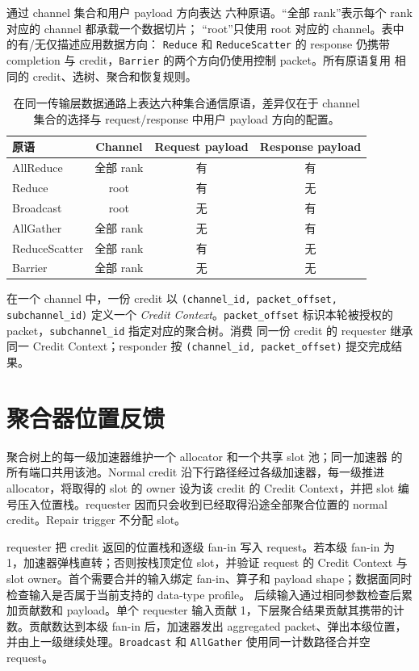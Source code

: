  通过 channel 集合和用户 payload 方向表达
六种原语。``全部 rank''表示每个 rank 对应的 channel 都承载一个数据切片；
``root''只使用 root 对应的 channel。表中的有/无仅描述应用数据方向：
\texttt{Reduce} 和 \texttt{ReduceScatter} 的 response 仍携带 completion
与 credit，\texttt{Barrier} 的两个方向仍使用控制 packet。所有原语复用
相同的 credit、选树、聚合和恢复规则。

\begin{table}[t]
\centering
\caption{\sysname 在同一传输层数据通路上表达六种集合通信原语，差异仅在于
channel 集合的选择与 request/response 中用户 payload 方向的配置。}
\label{tab:collective-mapping}
\begin{tabular}{lccc}
\toprule
原语 & Channel & Request payload & Response payload \\
\midrule
AllReduce & 全部 rank & 有 & 有 \\
Reduce & root & 有 & 无 \\
Broadcast & root & 无 & 有 \\
AllGather & 全部 rank & 无 & 有 \\
ReduceScatter & 全部 rank & 有 & 无 \\
Barrier & 全部 rank & 无 & 无 \\
\bottomrule
\end{tabular}
\end{table}

在一个 channel 中，一份 credit 以 \texttt{(channel\_id, packet\_offset,
subchannel\_id)} 定义一个 \emph{Credit Context}。\texttt{packet\_offset}
标识本轮被授权的 packet，\texttt{subchannel\_id} 指定对应的聚合树。消费
同一份 credit 的 requester 继承同一 Credit Context；responder 按
\texttt{(channel\_id, packet\_offset)} 提交完成结果。

\section{聚合器位置反馈}
\label{ssec:agg-feedback}

聚合树上的每一级加速器维护一个 allocator 和一个共享 slot 池；同一加速器
的所有端口共用该池。Normal credit 沿下行路径经过各级加速器，每一级推进
allocator，将取得的 slot 的 owner 设为该 credit 的 Credit Context，并把
slot 编号压入位置栈。requester 因而只会收到已经取得沿途全部聚合位置的
normal credit。Repair trigger 不分配 slot。

requester 把 credit 返回的位置栈和逐级 fan-in 写入 request。若本级
fan-in 为 1，加速器弹栈直转；否则按栈顶定位 slot，并验证 request 的
Credit Context 与 slot owner。首个需要合并的输入绑定 fan-in、算子和
payload shape；数据面同时检查输入是否属于当前支持的 data-type profile。
后续输入通过相同参数检查后累加贡献数和 payload。单个 requester 输入贡献
1，下层聚合结果贡献其携带的计数。贡献数达到本级 fan-in 后，加速器发出
aggregated packet、弹出本级位置，并由上一级继续处理。\texttt{Broadcast}
和 \texttt{AllGather} 使用同一计数路径合并空 request。

